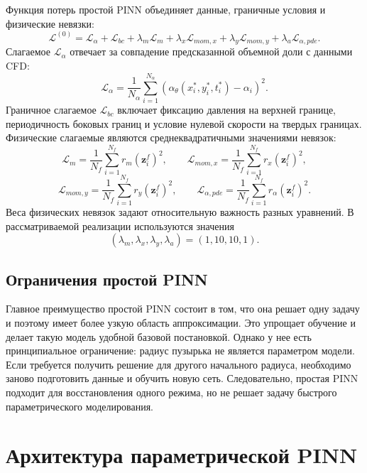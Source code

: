 Функция потерь простой PINN объединяет данные, граничные условия и физические
невязки:
\begin{equation}
    \mathcal{L}^{(0)}
    =
    \mathcal{L}_{\alpha}
    +
    \mathcal{L}_{bc}
    +
    \lambda_m\mathcal{L}_{m}
    +
    \lambda_x\mathcal{L}_{mom,x}
    +
    \lambda_y\mathcal{L}_{mom,y}
    +
    \lambda_a\mathcal{L}_{\alpha,pde}.
    \label{eq:chapter2_loss_simple}
\end{equation}
Слагаемое \(\mathcal{L}_{\alpha}\) отвечает за совпадение предсказанной
объемной доли с данными CFD:
\begin{equation}
    \mathcal{L}_{\alpha}
    =
    \frac{1}{N_\alpha}
    \sum_{i=1}^{N_\alpha}
    \left(
        \alpha_\theta(x_i^*,y_i^*,t_i^*)-\alpha_i
    \right)^2.
\end{equation}
Граничное слагаемое \(\mathcal{L}_{bc}\) включает фиксацию давления на верхней
границе, периодичность боковых границ и условие нулевой скорости на твердых
границах. Физические слагаемые являются среднеквадратичными значениями
невязок:
\[
    \mathcal{L}_{m}
    =
    \frac{1}{N_f}\sum_{i=1}^{N_f}r_m(\mathbf{z}_i^f)^2,
    \qquad
    \mathcal{L}_{mom,x}
    =
    \frac{1}{N_f}\sum_{i=1}^{N_f}r_x(\mathbf{z}_i^f)^2,
\]
\[
    \mathcal{L}_{mom,y}
    =
    \frac{1}{N_f}\sum_{i=1}^{N_f}r_y(\mathbf{z}_i^f)^2,
    \qquad
    \mathcal{L}_{\alpha,pde}
    =
    \frac{1}{N_f}\sum_{i=1}^{N_f}r_\alpha(\mathbf{z}_i^f)^2.
\]
Веса физических невязок задают относительную важность разных уравнений. В
рассматриваемой реализации используются значения
\[
    (\lambda_m,\lambda_x,\lambda_y,\lambda_a)=(1,10,10,1).
\]

\subsection{Ограничения простой PINN}

Главное преимущество простой PINN состоит в том, что она решает одну задачу и
поэтому имеет более узкую область аппроксимации. Это упрощает обучение и делает
такую модель удобной базовой постановкой. Однако у нее есть принципиальное
ограничение: радиус пузырька не является параметром модели. Если требуется
получить решение для другого начального радиуса, необходимо заново подготовить
данные и обучить новую сеть. Следовательно, простая PINN подходит для
восстановления одного режима, но не решает задачу быстрого параметрического
моделирования.

\section{Архитектура параметрической PINN}

